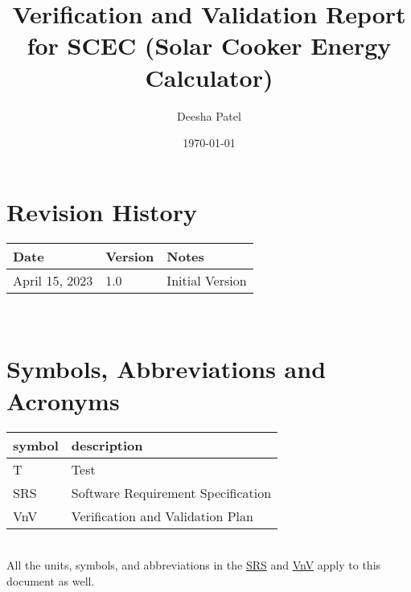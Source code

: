 \documentclass[12pt, titlepage]{article}
\begin{document}
\title{Verification and Validation Report for SCEC (Solar Cooker Energy Calculator)} 
\author{Deesha Patel}
\date{\today}
	
\maketitle


\section{Revision History}

\begin{tabularx}{\textwidth}{p{3cm}p{2cm}X}
\toprule {\bf Date} & {\bf Version} & {\bf Notes}\\
\midrule
April 15, 2023 & 1.0 & Initial Version\\
\bottomrule
\end{tabularx}

~\newpage

\section{Symbols, Abbreviations and Acronyms}

\renewcommand{\arraystretch}{1.2}
\begin{tabular}{l l} 
  \toprule		
  \textbf{symbol} & \textbf{description}\\
  \midrule 
  T & Test\\
  SRS & Software Requirement Specification \\ 
  VnV & Verification and Validation Plan \\
  \bottomrule
\end{tabular}\\

All the units, symbols, and abbreviations in the \href{https://github.com/DeeshaPatel/CAS-741-Solar-Cooker/blob/f238dbff9720fb98d3323fd5832d04ab9ce7597f/docs/SRS/SRS.pdf}{SRS} and \href{https://github.com/DeeshaPatel/CAS-741-Solar-Cooker/blob/f238dbff9720fb98d3323fd5832d04ab9ce7597f/docs/VnVPlan/VnVPlan.pdf}{VnV} apply to this document as well.  

\newpage

\tableofcontents

\listoftables %

\newpage

\end{document}
